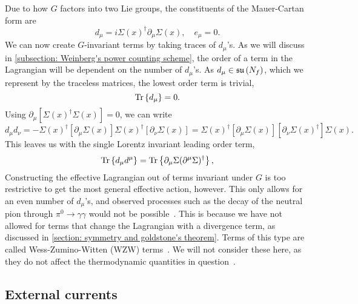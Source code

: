 %
Due to how $G$ factors into two Lie groups, the constituents of the Mauer-Cartan form are 
%
\begin{equation}
    d_\mu = i \Sigma(x)^\dagger \partial_\mu \Sigma(x),\quad
    e_\mu = 0.
\end{equation}
%
We can now create $G$-invariant terms by taking traces of $d_\mu$'s.
As we will discuss in \autoref{subsection: Weinberg's power counting scheme}, the order of a term in the Lagrangian will be dependent on the number of $d_\mu$'s.
As $d_\mu \in \mathfrak{su}\left(N_f\right)$, which we represent by the traceless matrices, the lowest order term is trivial,
%
\begin{equation}
    \text{Tr} \left\{ d_\mu \right\} = 0.
\end{equation}
%
Using $\partial_\mu [\Sigma(x)^\dagger\Sigma(x)] = 0 $, we can write
\begin{equation}
    d_\mu d_\nu = 
    - \Sigma(x)^\dagger [\partial_\mu \Sigma(x)] \Sigma(x)^\dagger [\partial_\nu \Sigma(x)]
    =\Sigma(x)^\dagger [\partial_\mu \Sigma(x)] [\partial_\nu \Sigma(x)^\dagger] \Sigma(x).
\end{equation}
%
This leaves us with the single Lorentz invariant leading order term,
\begin{equation}
    \text{Tr} \left\{ d_\mu d^\mu \right\} = \text{Tr} \left\{ \partial_\mu \Sigma (\partial^\mu \Sigma)^\dagger \right\},
\end{equation}
%
Constructing the effective Lagrangian out of terms invariant under $G$ is too restrictive to get the most general effective action, however.
This only allows for an even number of $d_\mu$'s, and observed processes such as the decay of the neutral pion through $\pi^0 \rightarrow \gamma \gamma$ would not be possible~\cite{schererIntroductionChiralPerturbation2002}.
This is because we have not allowed for terms that change the Lagrangian with a divergence term, as discussed in \autoref{section: symmetry and goldstone's theorem}.
Terms of this type are called Wess-Zumino-Witten (WZW) terms~\cite{weinbergQuantumTheoryFields1996}.
We will not consider these here, as they do not affect the thermodynamic quantities in question~\cite{adhikariTwoflavorChiralPerturbation2019}.





\subsection{External currents}

